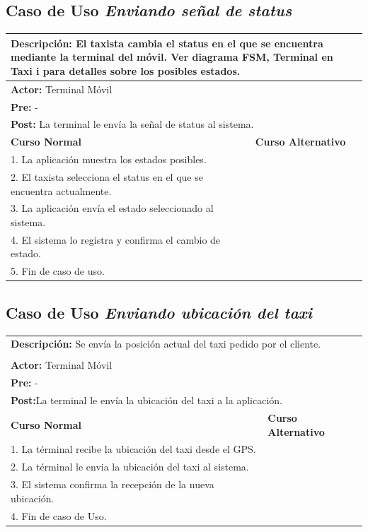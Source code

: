 \documentclass[a4paper]{article}
\begin{document}
\subsection{Caso de Uso \textit{Enviando se\~nal de status}}
\begin{center}
\begin{tabular}{|p{10cm} | p{6cm}|}
\hline
\multicolumn{2}{|p{16cm}|}{\textbf{Descripci\'on:} El taxista cambia el status en el que se encuentra mediante la terminal del m\'ovil. Ver diagrama FSM, Terminal en Taxi i para detalles sobre los posibles estados.} \\
\hline
\multicolumn{2}{|p{15cm}|}{\textbf{Actor:} Terminal M\'ovil } \\
\hline
\multicolumn{2}{|p{15cm}|}{\textbf{Pre:} - } \\
\hline
\multicolumn{2}{|p{15cm}|}{\textbf{Post:} La terminal le env\'ia la se\~nal de status al sistema. }\\
\hline
\textbf{Curso Normal}  & \textbf{Curso Alternativo} \\ \hline
1. La aplicaci\'on muestra los estados posibles.  & \\ \hline
2. El taxista selecciona el status en el que se encuentra actualmente. & \\ \hline
3. La aplicaci\'on env\'ia el estado seleccionado al sistema. & \\ \hline
4. El sistema lo registra y confirma el cambio de estado. & \\ \hline
5. Fin de caso de uso. & \\ \hline
\end{tabular}
\end{center}

\subsection{Caso de Uso \textit{Enviando ubicaci\'on del taxi}}
\begin{center}
\begin{tabular}{|p{10cm} | p{6cm}|}
\hline
\multicolumn{2}{|p{16cm}|}{\textbf{Descripci\'on: } Se env\'ia la posici\'on actual del taxi pedido por el cliente. } \\  \\
\hline
\multicolumn{2}{|p{15cm}|}{\textbf{Actor:} Terminal M\'ovil } \\
\hline
\multicolumn{2}{|p{15cm}|}{\textbf{Pre:} - } \\
\hline
\multicolumn{2}{|p{15cm}|}{\textbf{Post:}La terminal le env\'ia la ubicaci\'on del taxi a la aplicaci\'on. }\\
\hline
\textbf{Curso Normal}  & \textbf{Curso Alternativo} \\ \hline
1. La t\'erminal recibe la ubicaci\'on del taxi desde el GPS. & \\ \hline
2. La t\'erminal le envia la ubicaci\'on del taxi al sistema. & \\ \hline
3. El sistema confirma la recepci\'on de la nueva ubicaci\'on. & \\ \hline
4. Fin de caso de Uso. & \\ \hline
\end{tabular}
\end{center}
\end{document}
